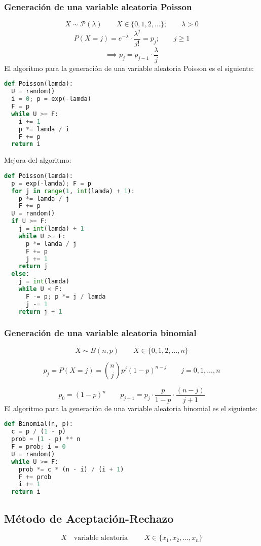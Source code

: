 \documentclass[11pt, a4paper]{article}
\theoremstyle{definition}
\begin{document}
\subsubsection{Generación de una variable aleatoria Poisson}

\[
X \sim \mathcal{P}(\lambda) \qquad X \in \{0, 1, 2, \ldots\}; \qquad \lambda > 0
\]
\[
P(X = j) =e^{-\lambda} \cdot \frac{\lambda^j}{j!} = p_j; \qquad j \geq 1
\]
\[
\implies p_j = p_{j-1} \cdot \frac{\lambda}{j}
\]
El algoritmo para la generación de una variable aleatoria Poisson es el siguiente:
\begin{lstlisting}[language=Python]
def Poisson(lamda):
  U = random()
  i = 0; p = exp(-lamda)
  F = p
  while U >= F:
    i += 1
    p *= lamda / i
    F += p
  return i
\end{lstlisting}
Mejora del algoritmo:
\begin{lstlisting}[language=Python]
def Poisson(lamda):
  p = exp(-lamda); F = p
  for j in range(1, int(lamda) + 1):
    p *= lamda / j
    F += p
  U = random()
  if U >= F:
    j = int(lamda) + 1
    while U >= F:
      p *= lamda / j
      F += p
      j += 1
    return j
  else:
    j = int(lamda)
    while U < F:
      F -= p; p *= j / lamda
      j -= 1
    return j + 1
\end{lstlisting}
\newpage

\subsubsection{Generación de una variable aleatoria binomial}

\[
X \sim B(n, p) \qquad X \in \{0, 1, 2, \ldots, n\}
\]

\[
p_j = P(X = j) = \binom{n}{j} p^j (1 - p)^{n - j} \qquad j = 0, 1, \ldots, n
\]

\[
p_0 = (1-p)^n \qquad p_{j+1} = p_j \cdot \frac{p}{1-p} \cdot \frac{(n - j) }{j + 1}
\] 
El algoritmo para la generación de una variable aleatoria binomial es el siguiente:
\begin{lstlisting}[language=Python]
def Binomial(n, p):
  c = p / (1 - p)
  prob = (1 - p) ** n
  F = prob; i = 0
  U = random()
  while U >= F:
    prob *= c * (n - i) / (i + 1)
    F += prob
    i += 1
  return i
\end{lstlisting}

\subsection{Método de Aceptación-Rechazo}
\[
X \quad \text{variable aleatoria } \qquad X \in \{x_1, x_2, \ldots, x_n\}
\]
\end{document}

